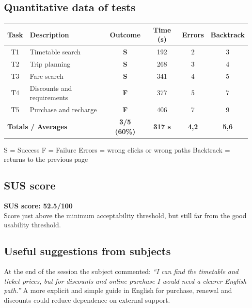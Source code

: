 ﻿\documentclass[11pt,a4paper]{article}
\begin{document}
\subsection*{Quantitative data of tests}
\begin{tcolorbox}[base]
\begin{center}
\renewcommand{\arraystretch}{1.4}
\begin{tabular}{clcccc}
\toprule
\textbf{Task} & \textbf{Description} &
\textbf{Outcome} & \textbf{Time (s)} &
\textbf{Errors} & \textbf{Backtrack} \\
\midrule
T1 & Timetable search             & \textbf{S} & 192 & 2 & 3 \\
T2 & Trip planning & \textbf{S} & 268 & 3 & 4 \\
T3 & Fare search           & \textbf{S} & 341 & 4 & 5 \\
T4 & Discounts and requirements  & \textbf{F} & 377 & 5 & 7 \\
T5 & Purchase and recharge       & \textbf{F} & 406 & 7 & 9 \\
\midrule
\multicolumn{2}{l}{\textbf{Totals / Averages}} &
\textbf{3/5 (60\%)} & \textbf{317 s} &
\textbf{4,2} & \textbf{5,6} \\
\bottomrule
\end{tabular}
\end{center}
\vspace{0.3cm}
\small S = Success \quad F = Failure \quad Errors = wrong clicks or wrong paths \quad Backtrack = returns to the previous page
\end{tcolorbox}

\subsection*{SUS score}
\begin{tcolorbox}[base]
\textbf{SUS score: 52.5/100}\\[0.2cm]
\small Score just above the minimum acceptability threshold, but still far from the good usability threshold.
\end{tcolorbox}

\subsection*{Useful suggestions from subjects}
\begin{tcolorbox}[base]
At the end of the session the subject commented:
\textit{``I can find the timetable and ticket prices, but for discounts and online purchase I would need a clearer English path.''}
A more explicit and simple guide in English for purchase, renewal and discounts could reduce dependence on external support.
\end{tcolorbox}
\end{document}
